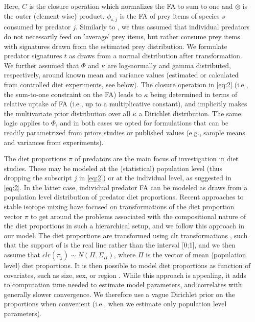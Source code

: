 \documentclass{article}%
\begin{document}
\begin{spacing}{1.9}
\begin{flushleft}
Here, $C$ is the closure operation which normalizes the FA to sum to
one and $\otimes$ is the outer (element wise) product. $\phi_{s,j}$ is
the FA of prey items of species $s$ consumed by predator
$j$. Similarly to \citet{parnell_bayesian_2012},
we thus assumed that individual predators do not necessarily feed on
'average' prey items, but rather consume prey items with
signatures drawn from the estimated prey distribution. We
formulate predator signatures $t$ as draws from a normal distribution after
transformation. We further assumed that
$\Phi$ and $\kappa$ are log-normally and gamma
distributed, respectively, around known mean and variance values (estimated or
calculated from controlled diet experiments, see below). The
closure operation in \autoref{eq:2} (i.e., the sum-to-one constraint
on the FA) leads to $\kappa$ being determined in terms of
relative uptake of FA (i.e., up to a multiplicative
constant), and implicitly makes the multivariate prior distribution over all $\kappa$ a Dirichlet
distribution. The same logic applies to $\Phi$, and in both cases we
opted for formulations that can be readily parametrized from priors
studies or published values (e.g., sample means and variances from experiments).

The diet proportions $\pi$ of predators are the main focus of investigation
in diet studies. These may be modeled at the (statistical) population
level (thus dropping the subscript $j$ in \autoref{eq:2}) or at the
individual level, as suggested in \autoref{eq:2}. In the latter case,
individual predator FA can be modeled as draws from a population
level distribution of predator diet proportions. Recent approaches to stable
isotope mixing have focused on transformations of the diet proportion
vector $\pi$ to get around the
problems associated with the compositional nature of the diet
proportions in such a hierarchical setup, and we follow this approach
in our model. The diet proportions are transformed using clr
transformations \citep{semmens_quantifying_2009}, such that the
support of is the real line rather than the interval [0;1], and we
then assume that $clr(\pi_j) \sim N(\Pi,\Sigma_{\Pi})$, where $\Pi$ is the
vector of mean (population level) diet proportions. It is
then possible to model diet proportions as function of
covariates, such as size, sex, or region \citep[i.e., in a regression
formulation,][]{parnell_bayesian_2012}. While this approach is appealing, it adds to computation time needed
to estimate model parameters, and correlates with generally slower convergence. We therefore use a vague Dirichlet prior
on the proportions when convenient (i.e., when we estimate only
population level parameters).


\end{flushleft}
\end{spacing}
\end{document}
